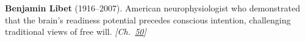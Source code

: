 \textbf{Benjamin Libet} (1916–2007). American neurophysiologist who demonstrated that the brain's readiness potential precedes conscious intention, challenging traditional views of free will. \emph{[Ch.~\hyperref[ch:consciousness]{50}]}

